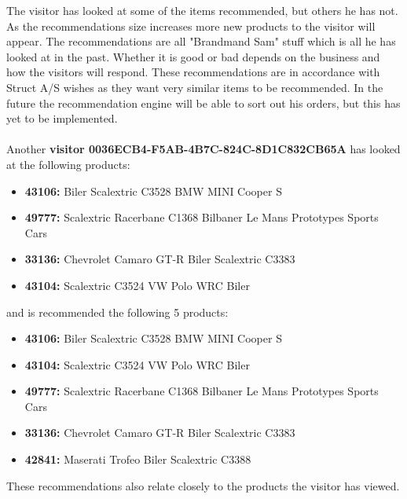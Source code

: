 The visitor has looked at some of the items recommended, but others he has not. As the recommendations size increases more new products to the visitor will appear. The recommendations are all "Brandmand Sam" stuff which is all he has looked at in the past. Whether it is good or bad depends on the business and how the visitors will respond. These recommendations are in accordance with Struct A/S wishes as they want very similar items to be recommended. In the future the recommendation engine will be able to sort out his orders, but this has yet to be implemented. \\\\

Another \textbf{visitor 0036ECB4-F5AB-4B7C-824C-8D1C832CB65A} has looked at the following products:
\begin{itemize}
\item \textbf{43106: }Biler Scalextric C3528 BMW MINI Cooper S
\item \textbf{49777: }Scalextric Racerbane C1368 Bilbaner Le Mans Prototypes Sports Cars
\item \textbf{33136: }Chevrolet Camaro GT-R Biler Scalextric C3383 
\item \textbf{43104: }Scalextric C3524 VW Polo WRC Biler
\end{itemize}
and is recommended the following 5 products:
\begin{itemize}
\item \textbf{43106: }Biler Scalextric C3528 BMW MINI Cooper S
\item \textbf{43104: }Scalextric C3524 VW Polo WRC Biler
\item \textbf{49777: }Scalextric Racerbane C1368 Bilbaner Le Mans Prototypes Sports Cars
\item \textbf{33136: }Chevrolet Camaro GT-R Biler Scalextric C3383
\item \textbf{42841: }Maserati Trofeo Biler Scalextric C3388
\end{itemize}

These recommendations also relate closely to the products the visitor has viewed. \\\\

